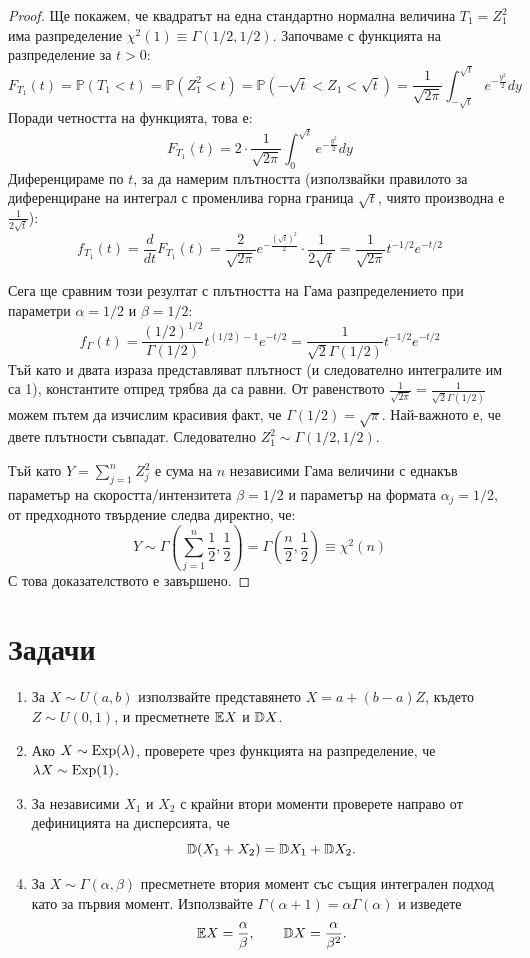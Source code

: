 \begin{proof}
Ще покажем, че квадратът на една стандартно нормална величина $T_1 = Z_1^2$ има разпределение $\chi^2(1) \equiv \Gamma(1/2, 1/2)$.
Започваме с функцията на разпределение за $t > 0$:
\[
F_{T_1}(t) = \mathbb{P}(T_1 < t) = \mathbb{P}(Z_1^2 < t) = \mathbb{P}(-\sqrt{t} < Z_1 < \sqrt{t}) = \frac{1}{\sqrt{2\pi}} \int_{-\sqrt{t}}^{\sqrt{t}} e^{-\frac{y^2}{2}} dy
\]
Поради четността на функцията, това е:
\[
F_{T_1}(t) = 2 \cdot \frac{1}{\sqrt{2\pi}} \int_{0}^{\sqrt{t}} e^{-\frac{y^2}{2}} dy
\]
Диференцираме по $t$, за да намерим плътността (използвайки правилото за диференциране на интеграл с променлива горна граница $\sqrt{t}$, чиято производна е $\frac{1}{2\sqrt{t}}$):
\[
f_{T_1}(t) = \frac{d}{dt} F_{T_1}(t) = \frac{2}{\sqrt{2\pi}} e^{-\frac{(\sqrt{t})^2}{2}} \cdot \frac{1}{2\sqrt{t}} = \frac{1}{\sqrt{2\pi}} t^{-1/2} e^{-t/2}
\]

Сега ще сравним този резултат с плътността на Гама разпределението при параметри $\alpha = 1/2$ и $\beta = 1/2$:
\[
f_\Gamma(t) = \frac{(1/2)^{1/2}}{\Gamma(1/2)} t^{(1/2) - 1} e^{-t/2} = \frac{1}{\sqrt{2}\Gamma(1/2)} t^{-1/2} e^{-t/2}
\]
Тъй като и двата израза представляват плътност (и следователно интегралите им са 1), константите отпред трябва да са равни. От равенството $\frac{1}{\sqrt{2\pi}} = \frac{1}{\sqrt{2}\Gamma(1/2)}$ можем пътем да изчислим красивия факт, че $\Gamma(1/2) = \sqrt{\pi}$.
Най-важното е, че двете плътности съвпадат. Следователно $Z_1^2 \sim \Gamma(1/2, 1/2)$.

Тъй като $Y = \sum_{j=1}^n Z_j^2$ е сума на $n$ независими Гама величини с еднакъв параметър на скоростта/интензитета $\beta = 1/2$ и параметър на формата $\alpha_j = 1/2$, от предходното твърдение следва директно, че:
\[
Y \sim \Gamma\left(\sum_{j=1}^n \frac{1}{2}, \frac{1}{2}\right) = \Gamma\left(\frac{n}{2}, \frac{1}{2}\right) \equiv \chi^2(n)
\]
С това доказателството е завършено.
\end{proof}

\section{Задачи}

\begin{enumerate}
    \item За $X\sim U(a,b)$ използвайте представянето $X=a+(b-a)Z$, където $Z\sim U(0,1)$, и пресметнете $\mathbb{E} X$ и $\mathbb{D} X$.
    \item Ако $X\sim\operatorname{Exp}(\lambda)$, проверете чрез функцията на разпределение, че $\lambda X\sim\operatorname{Exp}(1)$.
    \item За независими $X_1$ и $X_2$ с крайни втори моменти проверете направо от дефиницията на дисперсията, че
    \[
    \mathbb{D}(X_1+X_2)=\mathbb{D} X_1+\mathbb{D} X_2.
    \]
    \item За $X\sim\Gamma(\alpha,\beta)$ пресметнете втория момент със същия интегрален подход като за първия момент. Използвайте $\Gamma(\alpha+1)=\alpha\Gamma(\alpha)$ и изведете
    \[
    \mathbb{E} X=\frac{\alpha}{\beta},\qquad
    \mathbb{D} X=\frac{\alpha}{\beta^2}.
    \]
\end{enumerate}
